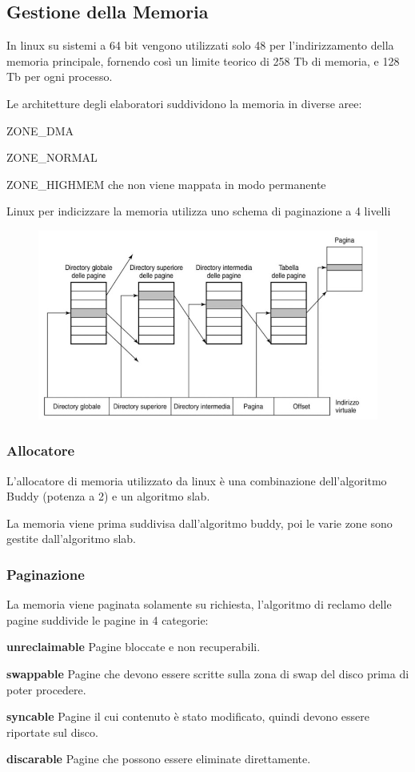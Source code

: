 \subsection{Gestione della Memoria}
In linux su sistemi a 64 bit vengono utilizzati solo 48 per l'indirizzamento della memoria principale, fornendo così un limite teorico di 258 Tb di memoria, e 128 Tb per ogni processo.

\spacer
Le architetture degli elaboratori suddividono la memoria in diverse aree:
\begin{sitemize}
    \item ZONE\_DMA
    \item ZONE\_NORMAL
    \item ZONE\_HIGHMEM che non viene mappata in modo permanente
\end{sitemize}

\spacer
Linux per indicizzare la memoria utilizza uno schema di paginazione a 4 livelli

\begin{figure}[H]
    \centering
    \includegraphics[width=0.5\linewidth]{assets/linux-pager.jpeg}
\end{figure}

\subsubsection{Allocatore}
L'allocatore di memoria utilizzato da linux è una combinazione dell'algoritmo Buddy (potenza a 2) e un algoritmo slab.

La memoria viene prima suddivisa dall'algoritmo buddy, poi le varie zone sono gestite dall'algoritmo slab.

\subsubsection{Paginazione}
La memoria viene paginata solamente su richiesta, l'algoritmo di reclamo delle pagine suddivide le pagine in 4 categorie:

\begin{sitemize}
    \item \textbf{unreclaimable} Pagine bloccate e non recuperabili.
    \item \textbf{swappable} Pagine che devono essere scritte sulla zona di swap del disco prima di poter procedere.
    \item \textbf{syncable} Pagine il cui contenuto è stato modificato, quindi devono essere riportate sul disco.
    \item \textbf{discarable} Pagine che possono essere eliminate direttamente.
\end{sitemize}

